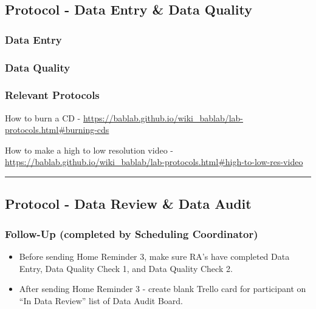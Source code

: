 \documentclass[]{book}
\begin{document}
\hypertarget{protocol---data-entry-data-quality-1}{%
\subsection{Protocol - Data Entry \& Data Quality}\label{protocol---data-entry-data-quality-1}}

\hypertarget{data-entry-6}{%
\subsubsection{Data Entry}\label{data-entry-6}}

\hypertarget{data-quality-4}{%
\subsubsection{Data Quality}\label{data-quality-4}}

\hypertarget{relevant-protocols-1}{%
\subsubsection{Relevant Protocols}\label{relevant-protocols-1}}

How to burn a CD - \url{https://bablab.github.io/wiki_bablab/lab-protocols.html\#burning-cds}

How to make a high to low resolution video - \url{https://bablab.github.io/wiki_bablab/lab-protocols.html\#high-to-low-res-video}

\begin{center}\rule{0.5\linewidth}{0.5pt}\end{center}

\hypertarget{protocol---data-review-data-audit-1}{%
\subsection{Protocol - Data Review \& Data Audit}\label{protocol---data-review-data-audit-1}}

\hypertarget{follow-up-completed-by-scheduling-coordinator-2}{%
\subsubsection{Follow-Up (completed by Scheduling Coordinator)}\label{follow-up-completed-by-scheduling-coordinator-2}}

\begin{itemize}
\item
  Before sending Home Reminder 3, make sure RA's have completed Data Entry, Data Quality Check 1, and Data Quality Check 2.
\item
  After sending Home Reminder 3 - create blank Trello card for participant on ``In Data Review'' list of Data Audit Board.
\end{itemize}
\end{document}
